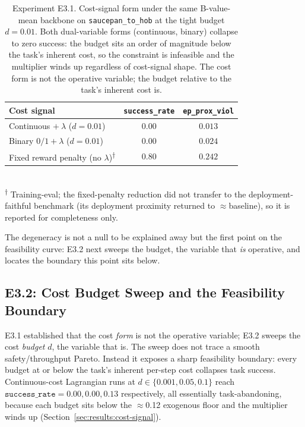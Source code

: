 \documentclass[11pt,a4paper]{report}
\begin{document}
\begin{table}[htbp]
\centering
\caption{Experiment E3.1. Cost-signal form under the same
B-value-mean backbone on \texttt{saucepan\_to\_hob} at the tight
budget $d = 0.01$. Both dual-variable forms (continuous, binary)
collapse to zero success: the budget sits an order of magnitude below
the task's inherent cost, so the constraint is infeasible and the
multiplier winds up regardless of cost-signal shape. The cost form is
not the operative variable; the budget relative to the task's inherent
cost is.}
\label{tab:e3.1-cost-signal}
\small
\begin{tabular}{lcc}
\toprule
Cost signal & \texttt{success\_rate} & \texttt{ep\_prox\_viol} \\
\midrule
Continuous $+\ \lambda$ ($d{=}0.01$)   & $0.00$ & $0.013$ \\
Binary $0/1 + \lambda$ ($d{=}0.01$)    & $0.00$ & $0.024$ \\
Fixed reward penalty (no $\lambda$)\textsuperscript{$\dagger$}    & $0.80$ & $0.242$ \\
\bottomrule
\end{tabular}\\
\footnotesize\textsuperscript{$\dagger$} Training-eval; the
fixed-penalty reduction did not transfer to the deployment-faithful
benchmark (its deployment proximity returned to $\approx$baseline), so
it is reported for completeness only.
\end{table}

The degeneracy is not a null to be explained away but the first point
on the feasibility curve: E3.2 next sweeps the budget, the variable
that \emph{is} operative, and locates the boundary this point sits
below.

\subsection{E3.2: Cost Budget Sweep and the Feasibility Boundary}
\label{sec:results:budget}

E3.1 established that the cost \emph{form} is not the operative
variable; E3.2 sweeps the cost \emph{budget} $d$, the variable that
is. The sweep does not trace a smooth safety/throughput Pareto.
Instead it exposes a sharp feasibility boundary: every budget at or
below the task's inherent per-step cost collapses task success.
Continuous-cost Lagrangian runs at $d \in \{0.001, 0.05, 0.1\}$ reach
$\texttt{success\_rate} = 0.00, 0.00, 0.13$ respectively, all
essentially task-abandoning, because each budget sits below the
$\approx$0.12 exogenous floor and the multiplier winds up
(Section~\ref{sec:results:cost-signal}).
\end{document}
